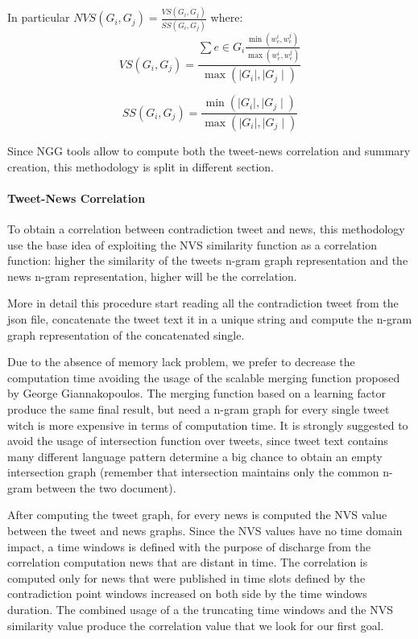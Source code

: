In particular $NVS(G_i,G_j) = \frac{VS(G_i,G_j)}{SS(G_i,G_j)}$ where:
\begin{equation}
 VS(G_i,G_j)=\frac{\sum e \in G_i \frac{\min(w_e^i, w_e^j)}{\max(w_e^i, w_e^j)}}{\max(\mid G_i \mid, \mid G_j \mid)}
\end{equation}

\begin{equation}
 SS(G_i,G_j)=\frac{\min(\mid G_i \mid, \mid G_j \mid)}{\max(\mid G_i \mid, \mid G_j \mid)}
\end{equation}

Since NGG tools allow to compute both the tweet-news correlation and summary creation, this methodology is split in different section.
\paragraph{Tweet-News Correlation}
To obtain a correlation between contradiction tweet and news, this methodology use the base idea of exploiting the NVS similarity function as a correlation function: higher the similarity of the tweets n-gram graph representation and the news n-gram representation, higher will be the correlation.

More in detail this procedure start reading all the contradiction tweet from the json file, concatenate the tweet text it in a unique string and compute the n-gram graph representation of the concatenated single. 

Due to the absence of memory lack problem, we prefer to decrease the computation time avoiding the usage of the scalable merging function proposed by George Giannakopoulos. The merging function based on a learning factor produce the same final result, but need a n-gram graph for every single tweet witch is more expensive in terms of computation time. It is strongly suggested to avoid the usage of intersection function over tweets, since tweet text contains many different language pattern determine a big chance to obtain an empty intersection graph (remember that intersection maintains only the common n-gram between the two document).

After computing the tweet graph, for every news is computed the NVS value between the tweet and news graphs. Since the NVS values have no time domain impact, a time windows is defined with the purpose of discharge from the correlation computation news that are distant in time. The correlation is computed only for news that were published in time slots defined by the contradiction point windows increased on both side by the time windows duration. The combined usage of a the truncating time windows  and the NVS similarity value produce the correlation value that we look for our first goal.
